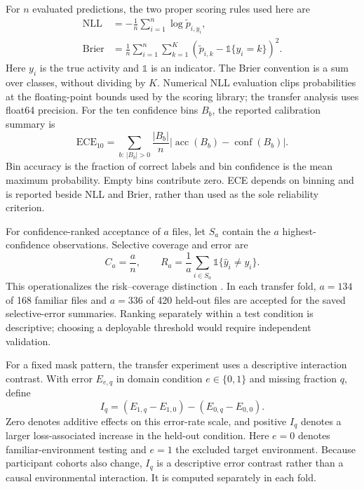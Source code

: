 \documentclass[a4paper,11pt,fleqn]{mira-author}
\begin{document}
For $n$ evaluated predictions, the two proper scoring rules used here are
\begin{equation}
 \begin{aligned}
 \mathrm{NLL}&=-\frac1n\sum_{i=1}^{n}\log\widetilde p_{i,y_i},\\
 \mathrm{Brier}&=\frac1n\sum_{i=1}^{n}\sum_{k=1}^{K}
 (\widetilde p_{i,k}-\mathbb{1}\{y_i=k\})^2.
 \end{aligned}
\label{eq:scores}
\end{equation}
Here $y_i$ is the true activity and $\mathbb{1}$ is an indicator. The Brier convention is a sum over classes, without dividing by $K$. Numerical NLL evaluation clips probabilities at the floating-point bounds used by the scoring library; the transfer analysis uses float64 precision. For the ten confidence bins $B_b$, the reported calibration summary is
\begin{equation}
 \mathrm{ECE}_{10}=\sum_{b:\,|B_b|>0}\frac{|B_b|}{n}
 |\operatorname{acc}(B_b)-\operatorname{conf}(B_b)|.
\label{eq:ece}
\end{equation}
Bin accuracy is the fraction of correct labels and bin confidence is the mean maximum probability. Empty bins contribute zero. ECE depends on binning and is reported beside NLL and Brier, rather than used as the sole reliability criterion.

For confidence-ranked acceptance of $a$ files, let $S_a$ contain the $a$ highest-confidence observations. Selective coverage and error are
\begin{equation}
 C_a=\frac{a}{n},\qquad
 R_a=\frac{1}{a}\sum_{i\in S_a}\mathbb{1}\{\widehat y_i\ne y_i\}.
\label{eq:selective}
\end{equation}
This operationalizes the risk--coverage distinction \cite{geifman2017}. In each transfer fold, $a=134$ of 168 familiar files and $a=336$ of 420 held-out files are accepted for the saved selective-error summaries. Ranking separately within a test condition is descriptive; choosing a deployable threshold would require independent validation.

For a fixed mask pattern, the transfer experiment uses a descriptive interaction contrast. With error $E_{e,q}$ in domain condition $e\in\{0,1\}$ and missing fraction $q$, define
\begin{equation}
 I_q=(E_{1,q}-E_{1,0})-(E_{0,q}-E_{0,0}).
\label{eq:interaction}
\end{equation}
Zero denotes additive effects on this error-rate scale, and positive $I_q$ denotes a larger loss-associated increase in the held-out condition. Here $e=0$ denotes familiar-environment testing and $e=1$ the excluded target environment. Because participant cohorts also change, $I_q$ is a descriptive error contrast rather than a causal environmental interaction. It is computed separately in each fold.
\end{document}
